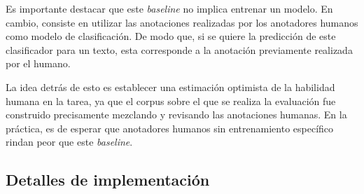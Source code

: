 Es importante destacar que este \emph{baseline} no implica entrenar un modelo. En cambio,
consiste en utilizar las anotaciones realizadas por los anotadores humanos como modelo de 
clasificaci\'on. De modo que, si se quiere la predicci\'on de este clasificador para un texto, 
esta corresponde a la anotaci\'on previamente realizada por el humano.

La idea detr\'as de esto es establecer una estimaci\'on optimista de la habilidad humana en
la tarea, ya que el corpus sobre el que se realiza la evaluaci\'on fue construido precisamente 
mezclando y revisando las anotaciones humanas. En la pr\'actica, es de esperar que 
anotadores humanos sin entrenamiento espec\'ifico rindan peor que este \emph{baseline}.

\subsection{Detalles de implementaci\'on}

